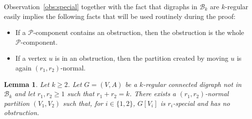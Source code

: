 \documentclass[11pt]{article}
\newtheorem{lemma}{Lemma}[section]
\newcommand{\mc}{\mathcal}
\begin{document}
Observation~\ref{obs:special} together with the fact that digraphs in $\mathcal B_k$ are $k$-regular easily implies the following facts that will be used routinely during the proof:
\begin{itemize}
    \item If a $\mc P$-component contains an obstruction, then the obstruction is the whole $\mc P$-component. 
    \item If a vertex $u$ is in an obstruction, then the partition created by moving $u$ is again $(r_1, r_2)$-normal.
\end{itemize}

\begin{lemma} \label{lem:partition}
Let $k \geq 2$. 
Let $G = (V, A)$ be a $k$-regular connected digraph not in $\mathcal B_{k}$ and let $r_{1}, r_{2} \geq 1$ such that $r_{1} + r_{2} = k$. There exists a $(r_1, r_2)$-normal partition $(V_{1},V_{2})$ such that, for $i \in \{1,2\}$, $G[V_{i}]$ is $r_i$-special and has no obstruction.
\end{lemma}
\end{document}
